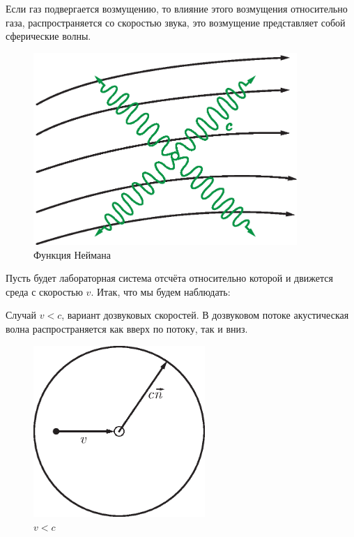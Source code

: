 \documentclass[14pt,a4paper,oneside]{extarticle}	%
\begin{document}
Если газ подвергается возмущению, то влияние этого возмущения относительно газа, распространяется со скоростью звука, это возмущение представляет собой сферические волны. 
\begin{figure}[h!] 	%
	\centering 		%
	\includegraphics[width=10cm]{14.eps} %
	\caption{Функция Неймана}
	\label{fig::15}
\end{figure}  

Пусть будет лабораторная система отсчёта относительно которой и движется среда с скоростью $ v $.
Итак, что мы будем наблюдать: 

Случай $ v<c $, вариант дозвуковых скоростей.
В дозвуковом потоке акустическая волна распространяется как вверх по потоку, так и вниз.
\begin{figure}[h!] 	%
	\centering 		%
	\includegraphics[width=6.5cm]{15.eps} %
	\caption{  $ v<c $ }
	\label{fig::16}
\end{figure}
\end{document}
